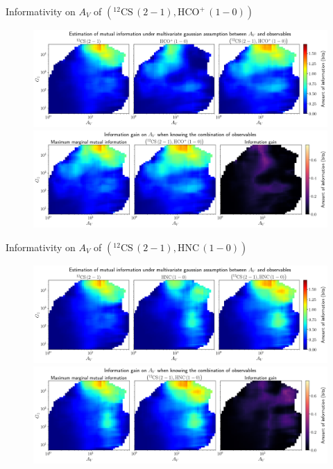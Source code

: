 \documentclass{beamer}
\begin{document}
\begin{frame}{Informativity on $A_V$ of $\left(\mathrm{^{12}CS\,(2-1)},\mathrm{HCO^+\,(1-0)}\right)$}
    \begin{figure}
        \centering
        \includegraphics[width=0.95\linewidth]{../linearinfo/av__12cs21_hcop10_linearinfo.png}
        \vfill
        \includegraphics[width=0.95\linewidth]{../linearinfo/av__12cs21_hcop10_linearinfo_gain.png}
    \end{figure}
\end{frame}

\begin{frame}{Informativity on $A_V$ of $\left(\mathrm{^{12}CS\,(2-1)},\mathrm{HNC\,(1-0)}\right)$}
    \begin{figure}
        \centering
        \includegraphics[width=0.95\linewidth]{../linearinfo/av__12cs21_hnc10_linearinfo.png}
        \vfill
        \includegraphics[width=0.95\linewidth]{../linearinfo/av__12cs21_hnc10_linearinfo_gain.png}
    \end{figure}
\end{frame}
\end{document}
